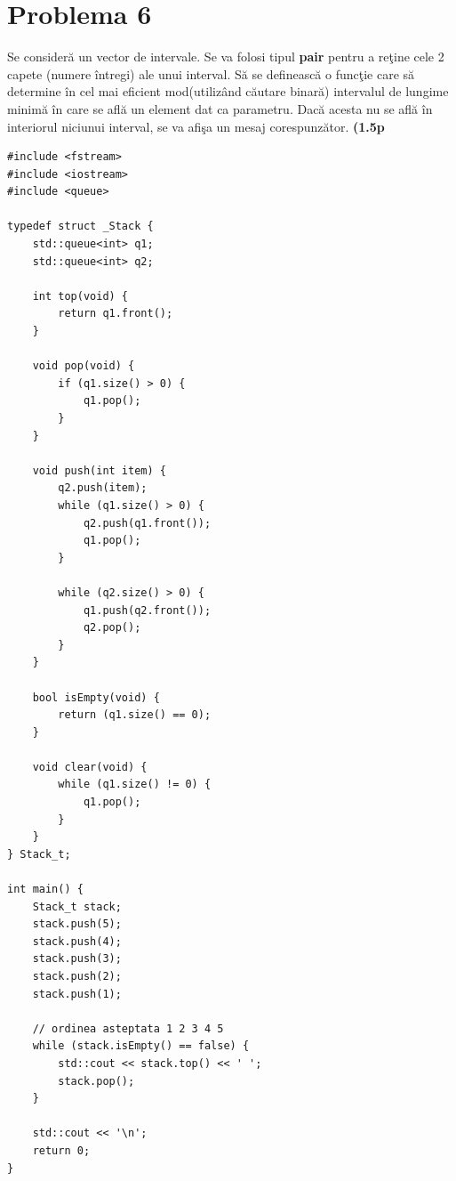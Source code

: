 \documentclass[12pt]{book}
\begin{document}
\section*{Problema 6}
Se consideră un vector de intervale. Se va folosi tipul \textbf{pair} pentru a reţine cele 2 capete (numere întregi) ale unui interval. Să se definească o funcţie care să determine în cel mai eficient mod(utilizând căutare binară) intervalul de lungime minimă în care se află un element dat ca parametru. Dacă acesta nu se află în interiorul niciunui interval, se va afişa un mesaj corespunzător. \textbf{(1.5p} \newline
\begin{lstlisting}
#include <fstream>
#include <iostream>
#include <queue>

typedef struct _Stack {
    std::queue<int> q1;
    std::queue<int> q2;

    int top(void) {
        return q1.front();
    }

    void pop(void) {
        if (q1.size() > 0) {
            q1.pop();
        }
    }

    void push(int item) {
        q2.push(item);
        while (q1.size() > 0) {
            q2.push(q1.front());
            q1.pop();
        }

        while (q2.size() > 0) {
            q1.push(q2.front());
            q2.pop();
        }
    }

    bool isEmpty(void) {
        return (q1.size() == 0);
    }

    void clear(void) {
        while (q1.size() != 0) {
            q1.pop();
        }
    }
} Stack_t;

int main() {
    Stack_t stack;
    stack.push(5);
    stack.push(4);
    stack.push(3);
    stack.push(2);
    stack.push(1);

    // ordinea asteptata 1 2 3 4 5
    while (stack.isEmpty() == false) {
        std::cout << stack.top() << ' ';
        stack.pop();
    }

    std::cout << '\n';
    return 0;
}
\end{lstlisting}

\newpage
\end{document}
